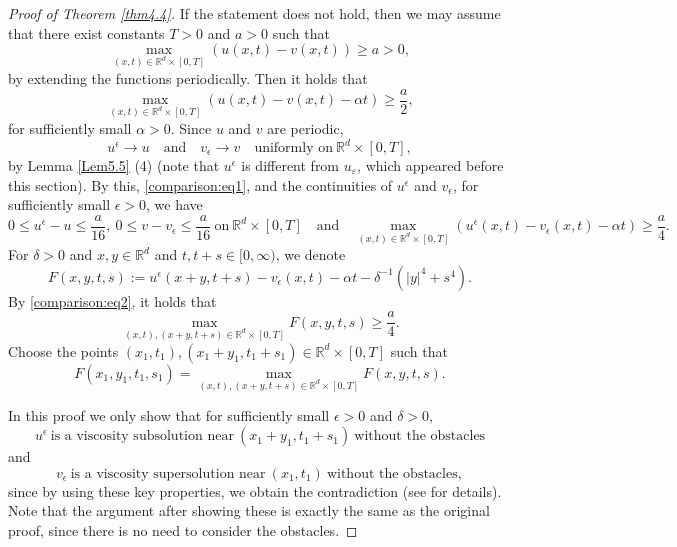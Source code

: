 \documentclass{amsart}
\theoremstyle{definition}
\def\R{{\mathbb{R}}}
\begin{document}
\begin{proof}[Proof of Theorem \ref{thm4.4}]
If the statement does not hold, then we may assume that there exist constants $T>0$ and $a>0$
such that
\[
\max_{(x,t) \in \R^d \times [0,T]}
(u(x,t)-v (x,t)) \geq a>0,
\]
by extending the functions periodically.
Then it holds that
\begin{equation}\label{comparison:eq1}
\max_{(x,t) \in \R^d \times [0,T]}
(u(x,t)-v (x,t)-\alpha t) \geq \frac{a}{2},
\end{equation}
for sufficiently small $\alpha>0$. Since $u$ and $v$ are periodic, 
\[
u^\epsilon \to u
\quad \text{and} \quad
v_\epsilon \to v
\quad 
\text{uniformly on}
\ \R^d \times [0,T],
\]
by Lemma \ref{Lem5.5} (4) (note that $u^\epsilon$ is different from $u_\varepsilon$, which appeared before this section).
By this, \eqref{comparison:eq1}, and the continuities of $u^\epsilon$ and $v_\epsilon$, for sufficiently small $\epsilon>0$, we have
\begin{equation}\label{comparison:eq2}
0\leq u^\epsilon -u\leq \frac{a}{16}, \ 
0\leq v -v_\epsilon \leq \frac{a}{16}
\ \text{on} \ \R^d \times [0,T]
\quad 
\text{and}
\quad
\max_{(x,t) \in \R^d \times [0,T]}
(u^\epsilon (x,t)-v_\epsilon (x,t)-\alpha t) \geq \frac{a}{4}.
\end{equation}
For $\delta>0$ and $x,y \in \R^d$ and $t, t+s \in [0,\infty)$, we denote
\[
F (x,y,t,s):=
u^\epsilon (x+y, t+s) - v_\epsilon (x,t) -\alpha t -\delta^{-1} (|y|^4 +s^4).
\]
By \eqref{comparison:eq2}, it holds that
\begin{equation}\label{compasiron:eq3}
\max _{(x,t), (x+y,t+s) \in \R^d \times [0,T]}
F (x,y,t,s) \geq \frac{a}{4}.
\end{equation}
Choose the points $(x_1,t_1), (x_1+y_1, t_1 +s_1) \in \R^d \times [0,T]$ such that
\begin{equation}\label{compasiron:eq4}
F(x_1,y_1,t_1,s_1)=
\max _{(x,t), (x+y,t+s) \in \R^d \times [0,T]}
F (x,y,t,s) .
\end{equation}

In this proof we only show that for sufficiently small $\epsilon >0$ and $\delta>0$,
\begin{equation}
\label{comparison:eq10}
u^\epsilon \ \text{is a viscosity subsolution near}
\ (x_1 +y_1,t_1+s_1)
\ \text{without the obstacles}
\end{equation}
and
\begin{equation}
\label{comparison:eq11}
v_\epsilon \ \text{is a viscosity supersolution near}
\ (x_1,t_1)
\ \text{without the obstacles},
\end{equation}
since by using these key properties, we obtain the contradiction (see \cite[pages 649--652]{MR1100206} for details).
Note that the argument after showing these is exactly the same as the original proof, since there is no need to consider the obstacles.


\end{proof}
\end{document}
